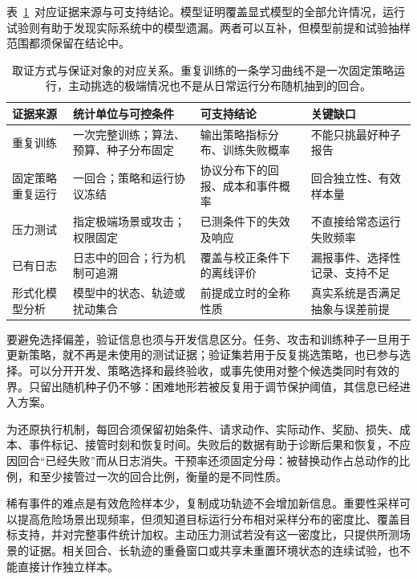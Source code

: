 表~\ref{tab:rl-trustworthy-evidence-sources}~对应证据来源与可支持结论。模型证明覆盖显式模型的全部允许情况，运行试验则有助于发现实际系统中的模型遗漏。两者可以互补，但模型前提和试验抽样范围都须保留在结论中。

\begin{table}[t]
  \centering
  \begin{tabularx}{\linewidth}{@{}>{\raggedright\arraybackslash}p{23mm}XXX@{}}
    \toprule
    证据来源 & 统计单位与可控条件 & 可支持结论 & 关键缺口 \\
    \midrule
    重复训练 & 一次完整训练；算法、预算、种子分布固定 & 输出策略指标分布、训练失败概率 & 不能只挑最好种子报告 \\
    固定策略重复运行 & 一回合；策略和运行协议冻结 & 协议分布下的回报、成本和事件概率 & 回合独立性、有效样本量 \\
    压力测试 & 指定极端场景或攻击；权限固定 & 已测条件下的失效及响应 & 不直接给常态运行失败频率 \\
    已有日志 & 日志中的回合；行为机制可追溯 & 覆盖与校正条件下的离线评价 & 漏报事件、选择性记录、支持不足 \\
    形式化模型分析 & 模型中的状态、轨迹或扰动集合 & 前提成立时的全称性质 & 真实系统是否满足抽象与误差前提 \\
    \bottomrule
  \end{tabularx}
  \caption{取证方式与保证对象的对应关系。重复训练的一条学习曲线不是一次固定策略运行，主动挑选的极端情况也不是从日常运行分布随机抽到的回合。}
  \label{tab:rl-trustworthy-evidence-sources}
\end{table}

要避免选择偏差，验证信息也须与开发信息区分。任务、攻击和训练种子一旦用于更新策略，就不再是未使用的测试证据；验证集若用于反复挑选策略，也已参与选择。可以分开开发、策略选择和最终验收，或事先使用对整个候选类同时有效的界。只留出随机种子仍不够：困难地形若被反复用于调节保护阈值，其信息已经进入方案。

为还原执行机制，每回合须保留初始条件、请求动作、实际动作、奖励、损失、成本、事件标记、接管时刻和恢复时间。失败后的数据有助于诊断后果和恢复，不应因回合“已经失败”而从日志消失。干预率还须固定分母：被替换动作占总动作的比例，和至少接管过一次的回合比例，衡量的是不同性质。

稀有事件的难点是有效危险样本少，复制成功轨迹不会增加新信息。重要性采样可以提高危险场景出现频率，但须知道目标运行分布相对采样分布的密度比、覆盖目标支持，并对完整事件统计加权。主动压力测试若没有这一密度比，只提供所测场景的证据。相关回合、长轨迹的重叠窗口或共享未重置环境状态的连续试验，也不能直接计作独立样本。

